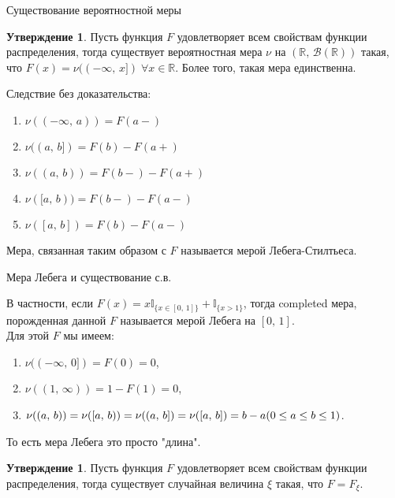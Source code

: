 \documentclass{beamer}%
\theoremstyle{definition}
\newtheorem{proposition}[theorem]{Утверждение}
\begin{document}
\begin{frame}{Существование вероятностной меры}
\begin{proposition}
    Пусть функция $F$ удовлетворяет всем свойствам функции распределения, тогда существует вероятностная мера $\nu$ на $(\mathbb{R},\, \mathcal{B}(\mathbb{R}))$ такая, что $F(x) = \nu ((-\infty,\, x]) \; \forall x\in \mathbb{R}$. Более того, такая мера единственна.
\end{proposition}
Следствие без доказательства:
\begin{enumerate}
    \item $\nu ((-\infty,\, a)) = F(a-)$
    \item $\nu ((a,\, b]) = F(b) - F(a+)$
    \item $\nu ((a,\, b)) = F(b-) - F(a+)$
    \item $\nu ([a,\, b)) = F(b-) - F(a-)$
    \item $\nu ([a,\, b]) = F(b) - F(a-)$
\end{enumerate}
Мера, связанная таким образом с $F$ называется мерой Лебега-Стилтьеса.
\end{frame}

\begin{frame}{Мера Лебега и существование с.в.}

В частности, если $F(x) = x \mathbb{I}_{\{x \in [0,\, 1]\}} + \mathbb{I}_{\{x > 1\}}$, тогда completed мера, порожденная данной $F$ называется мерой Лебега на $[0,\, 1]$.\\
Для этой $F$ мы имеем:
\begin{enumerate}
    \item $\nu ((-\infty,\, 0]) = F(0) = 0$,
    \item $\nu ((1,\, \infty)) = 1 - F(1) = 0$,
    \item $\nu ((a,\, b)) = \nu ([a,\, b)) = \nu ((a,\, b]) = \nu ([a,\, b]) = b - a\\
    (0 \le a \le b \le 1)$.
\end{enumerate}
То есть мера Лебега это просто "длина".

\begin{proposition}
    Пусть функция $F$ удовлетворяет всем свойствам функции распределения, тогда существует случайная величина $\xi$ такая, что $F=F_{\xi}$.
\end{proposition}

\end{frame}
\end{document}
